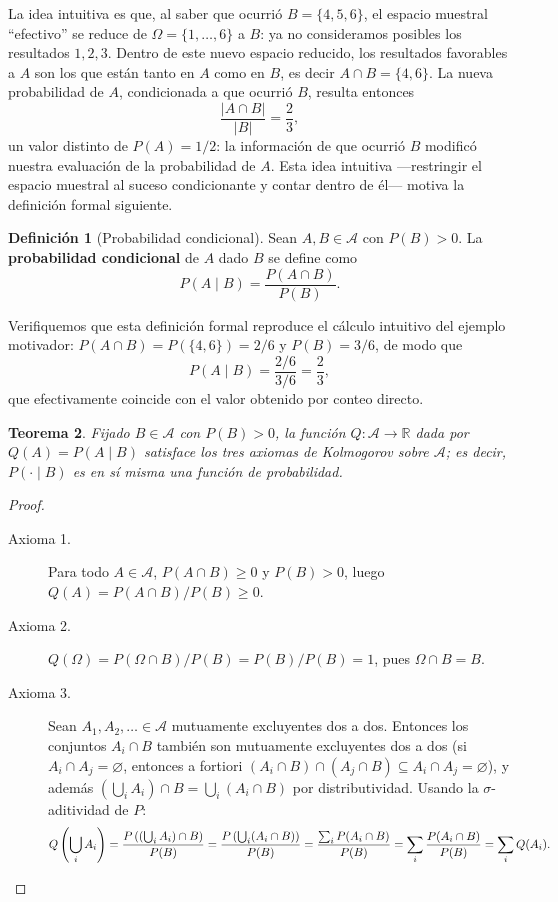 \documentclass[11pt,a4paper]{article}
\theoremstyle{plain}
\newtheorem{teorema}{Teorema}[section]
\theoremstyle{definition}
\newtheorem{definicion}[teorema]{Definición}
\theoremstyle{remark}
\begin{document}
La idea intuitiva es que, al saber que ocurrió $B=\{4,5,6\}$, el espacio muestral ``efectivo'' se reduce de $\Omega=\{1,\dots,6\}$ a $B$: ya no consideramos posibles los resultados $1,2,3$. Dentro de este nuevo espacio reducido, los resultados favorables a $A$ son los que están tanto en $A$ como en $B$, es decir $A\cap B = \{4,6\}$. La nueva probabilidad de $A$, condicionada a que ocurrió $B$, resulta entonces
\[
\frac{|A\cap B|}{|B|} = \frac{2}{3},
\]
un valor distinto de $P(A)=1/2$: la información de que ocurrió $B$ modificó nuestra evaluación de la probabilidad de $A$. Esta idea intuitiva —restringir el espacio muestral al suceso condicionante y contar dentro de él— motiva la definición formal siguiente.

\begin{definicion}[Probabilidad condicional]
Sean $A, B \in \mathcal{A}$ con $P(B) > 0$. La \textbf{probabilidad condicional} de $A$ dado $B$ se define como
\[
P(A \mid B) = \frac{P(A \cap B)}{P(B)}.
\]
\end{definicion}

Verifiquemos que esta definición formal reproduce el cálculo intuitivo del ejemplo motivador: $P(A\cap B) = P(\{4,6\}) = 2/6$ y $P(B) = 3/6$, de modo que
\[
P(A\mid B) = \frac{2/6}{3/6} = \frac{2}{3},
\]
que efectivamente coincide con el valor obtenido por conteo directo.

\begin{teorema}
Fijado $B \in \mathcal{A}$ con $P(B)>0$, la función $Q: \mathcal{A} \to \mathbb{R}$ dada por $Q(A) = P(A\mid B)$ satisface los tres axiomas de Kolmogorov sobre $\mathcal{A}$; es decir, $P(\cdot\mid B)$ es en sí misma una función de probabilidad.
\end{teorema}

\begin{proof}
\begin{description}
\item[Axioma 1.] Para todo $A\in\mathcal{A}$, $P(A\cap B)\geq 0$ y $P(B)>0$, luego $Q(A) = P(A\cap B)/P(B) \geq 0$.
\item[Axioma 2.] $Q(\Omega) = P(\Omega\cap B)/P(B) = P(B)/P(B) = 1$, pues $\Omega\cap B = B$.
\item[Axioma 3.] Sean $A_1,A_2,\dots \in \mathcal{A}$ mutuamente excluyentes dos a dos. Entonces los conjuntos $A_i\cap B$ también son mutuamente excluyentes dos a dos (si $A_i\cap A_j=\varnothing$, entonces a fortiori $(A_i\cap B)\cap(A_j\cap B) \subseteq A_i\cap A_j=\varnothing$), y además $\left(\bigcup_i A_i\right)\cap B = \bigcup_i (A_i\cap B)$ por distributividad. Usando la $\sigma$-aditividad de $P$:
\[
Q\left(\bigcup_i A_i\right) = \frac{P\left(\left(\bigcup_i A_i\right)\cap B\right)}{P(B)} = \frac{P\left(\bigcup_i (A_i\cap B)\right)}{P(B)} = \frac{\sum_i P(A_i\cap B)}{P(B)} = \sum_i \frac{P(A_i\cap B)}{P(B)} = \sum_i Q(A_i). \qedhere
\]
\end{description}
\end{proof}
\end{document}
